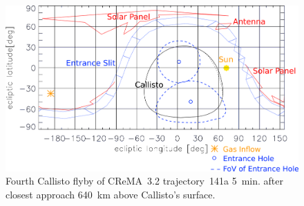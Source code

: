 	\begin{figure}[h!]
		\centering
		\includegraphics[width = .7\textwidth]{Bilder/NIM_pointing_2031JAN15195700.png}
		\caption{Fourth Callisto flyby of CReMA~3.2 trajectory~141a \cite{SOC_Crema3p2} 5~min. after closest approach 640~km above Callisto's surface.}
		\label{fig:FlybyCal1957}
	\end{figure}
